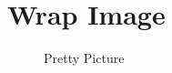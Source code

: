 \documentclass[a4paper,12pt]{book}
\begin{document}
\enlargethispage{\baselineskip}
 
 
\blindtext[2]
 
 
\blinditemize
\blindenumerate
\blinddescription
 
 
 
 
 
\newpage
 
\blindtext
 
 
 
 
\begin{figure}[ht]
\centering
 
 
 
 
\end{figure}
\blindtext
 
\newpage
 
\section*{Wrap Image}
 
 
\begingroup
 
 
\setlength{\intextsep}{0pt}
 
 
\setlength{\columnsep}{15pt}
 
 
 
 
 
\begin{wrapfigure}{r}{0.45\textwidth}
\centering
 
  \caption{Pretty Picture}\label{fig:prettypic}
\end{wrapfigure}
 
\end{document}

